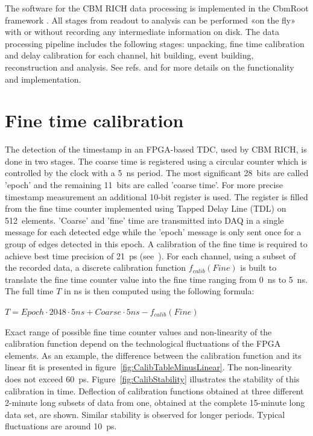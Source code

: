 \documentclass[final,5p,times,twocolumn]{elsarticle}
\begin{document}
The software for the CBM RICH data processing is implemented in the CbmRoot framework \cite{SEMEN}. All stages from readout to analysis can be performed «on the fly» with or without recording any intermediate information on disk. The data processing pipeline includes the following stages: unpacking, fine time calibration and delay calibration for each channel, hit building, event building, reconstruction and analysis. See refs. \cite{PEPAN} and \cite{RINGS} for more details on the functionality and implementation.

\section{Fine time calibration}

The detection of the timestamp in an FPGA-based TDC, used by CBM RICH, is done in two stages. The coarse time is registered using a circular counter which is controlled by the clock with a 5~ns period. The most significant 28~bits are called 'epoch' and the remaining 11~bits are called 'coarse time'. For more precise timestamp measurement an additional 10-bit register is used. The register is filled from the fine time counter implemented using Tapped Delay Line (TDL) on 512~elements.
'Coarse' and 'fine' time are transmitted into DAQ in a single message for each detected edge while the 'epoch' message is only sent once for a group of edges detected in this epoch.
A calibration of the fine time is required to achieve best time precision of 21~ps (see~\cite{FINECALIB,PEPAN}). For each channel, using a subset of the recorded data, a discrete calibration function $ f_{calib}(Fine) $ is built to translate the fine time counter value into the fine time ranging from 0~ns to 5~ns. The full time $ T $ in ns is then computed using the following formula:

{\centering
$ T = Epoch \cdot 2048 \cdot 5ns + Coarse \cdot 5ns - f_{calib}(Fine) $ \\
}

Exact range of possible fine time counter values and non-linearity of the calibration function depend on the technological fluctuations of the FPGA elements. As an example, the difference between the calibration function and its linear fit is presented in figure~\ref{fig:CalibTableMinusLinear}. The non-linearity does not exceed 60~ps. Figure~\ref{fig:CalibStability} illustrates the stability of this calibration in time. Deflection of calibration functions obtained at three different 2-minute long subsets of data from one, obtained at the complete 15-minute long data set, are shown. Similar stability is observed for longer periods. Typical fluctuations are around 10~ps.
\end{document}
